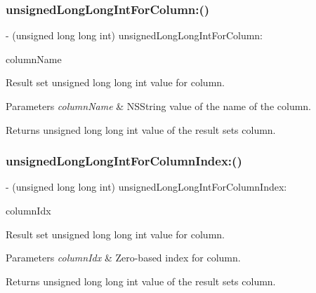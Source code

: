 \subsubsection{\texorpdfstring{unsigned\+Long\+Long\+Int\+For\+Column\+:()}{unsignedLongLongIntForColumn:()}}
{\footnotesize\ttfamily -\/ (unsigned long long int) unsigned\+Long\+Long\+Int\+For\+Column\+: \begin{DoxyParamCaption}\item[{(N\+S\+String$\ast$)}]{column\+Name }\end{DoxyParamCaption}}

Result set {\ttfamily unsigned long long int} value for column.


\begin{DoxyParams}{Parameters}
{\em column\+Name} & {\ttfamily N\+S\+String} value of the name of the column.\\
\hline
\end{DoxyParams}
\begin{DoxyReturn}{Returns}
{\ttfamily unsigned long long int} value of the result set\textquotesingle{}s column. 
\end{DoxyReturn}
\mbox{\label{interface_o_p_t_l_y_f_m_d_b_result_set_ad3f626894ab5132ee0c41383951ce62d}} 
\subsubsection{\texorpdfstring{unsigned\+Long\+Long\+Int\+For\+Column\+Index\+:()}{unsignedLongLongIntForColumnIndex:()}}
{\footnotesize\ttfamily -\/ (unsigned long long int) unsigned\+Long\+Long\+Int\+For\+Column\+Index\+: \begin{DoxyParamCaption}\item[{(int)}]{column\+Idx }\end{DoxyParamCaption}}

Result set {\ttfamily unsigned long long int} value for column.


\begin{DoxyParams}{Parameters}
{\em column\+Idx} & Zero-\/based index for column.\\
\hline
\end{DoxyParams}
\begin{DoxyReturn}{Returns}
{\ttfamily unsigned long long int} value of the result set\textquotesingle{}s column. 
\end{DoxyReturn}
\mbox{\label{interface_o_p_t_l_y_f_m_d_b_result_set_ae19dc3c97fc5fa7fef98ce2a74471294}} 
